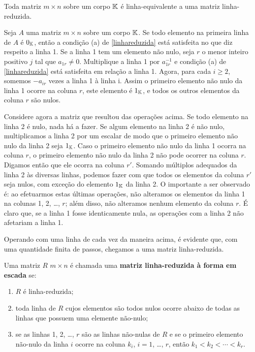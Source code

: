 \begin{teorema}
Toda matriz $m \times n$ sobre um corpo $\mathbb{K}$ \'e linha-equivalente a uma matriz linha-reduzida.
\end{teorema}
\begin{prova}
Seja $A$ uma matriz $m \times n$ sobre um corpo $\mathbb{K}$. Se todo elemento na primeira linha de $A$ \'e $0_{\mathbb{K}}$, ent\~ao a condi\c{c}\~ao (a) de \eqref{linhareduzida} est\'a satisfeita no que diz respeito a linha 1. Se a linha 1 tem um elemento n\~ao nulo, seja $r$ o menor inteiro positivo $j$ tal que $a_{1r} \ne 0$. Multiplique a linha 1 por $a_{1r}^{-1}$ e condi\c{c}\~ao (a) de \eqref{linhareduzida} est\'a satisfeita em rela\c{c}\~ao a linha 1. Agora, para cada $i \ge 2$, somemos $-a_{ir}$ vezes a linha 1 \`a linha i. Assim o primeiro elemento n\~ao nulo da linha 1 ocorre na coluna $r$, este elemento \'e $1_{\mathbb{K}}$, e todos os outros elementos da coluna $r$ s\~ao nulos.

Considere agora a matriz que resultou das opera\c{c}\~oes acima. Se todo elemento na linha 2 \'e nulo, nada h\'a a fazer. Se algum elemento na linha 2 \'e n\~ao nulo, multiplicamos a linha 2 por um escalar de modo que o primeiro elemento n\~ao nulo da linha 2 seja $1_{\mathbb{K}}$. Caso o primeiro elemento n\~ao nulo da linha 1 ocorra na coluna $r$, o primeiro elemento n\~ao nulo da linha 2 n\~ao pode ocorrer na coluna $r$. Digamos ent\~ao que ele ocorra na coluna $r'$. Somando m\'ultiplos adequados da linha 2 \`as diversas linhas, podemos fazer com que todos os elementos da coluna $r'$ seja nulos, com exce\c{c}\~ao do elemento $1_{\mathbb{K}}$ da linha 2. O importante a ser observado \'e: ao efetuarmos estas \'ultimas opera\c{c}\~oes, n\~ao alteramos os elementos da linha 1 na colunas 1, 2, \dots, $r$; al\'em disso, n\~ao alteramos nenhum elemento da coluna $r$. \'E claro que, se a linha 1 fosse identicamente nula, as opera\c{c}\~oes com a linha 2 n\~ao afetariam a linha 1.

Operando com uma linha de cada vez da maneira acima, \'e evidente que, com uma quantidade finita de passos, chegamos a uma matriz linha-reduzida.
\end{prova}

\begin{definicao}
Uma matriz $R$ $m \times n$ \'e chamada uma \textbf{matriz linha-reduzida \`a forma em escada} se:
\begin{enumerate}
	\item $R$ \'e linha-reduzida;
	\item toda linha de $R$ cujos elementos s\~ao todos nulos ocorre abaixo de todas as linhas que possuem uma elemente n\~ao-nulo;
	\item se as linhas 1, 2, \dots, $r$ s\~ao as linhas n\~ao-nulas de $R$ e se o primeiro elemento n\~ao-nulo da linha $i$ ocorre na coluna $k_i$, $i = 1$, \dots, $r$, ent\~ao $k_1 < k_2 < \cdots < k_r$.
\end{enumerate}
\end{definicao}

